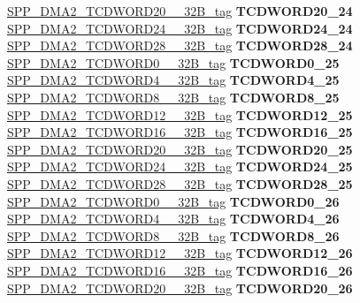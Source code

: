 \begin{DoxyCompactItemize}
\begin{tabbing}
\>\>\mbox{\hyperlink{unionSPP__DMA2__TCDWORD20____32B__tag}{SPP\_DMA2\_TCDWORD20\_\_32B\_tag}} {\bfseries TCDWORD20\_24}\\
\>\>\mbox{\hyperlink{unionSPP__DMA2__TCDWORD24____32B__tag}{SPP\_DMA2\_TCDWORD24\_\_32B\_tag}} {\bfseries TCDWORD24\_24}\\
\>\>\mbox{\hyperlink{unionSPP__DMA2__TCDWORD28____32B__tag}{SPP\_DMA2\_TCDWORD28\_\_32B\_tag}} {\bfseries TCDWORD28\_24}\\
\>\>\mbox{\hyperlink{unionSPP__DMA2__TCDWORD0____32B__tag}{SPP\_DMA2\_TCDWORD0\_\_32B\_tag}} {\bfseries TCDWORD0\_25}\\
\>\>\mbox{\hyperlink{unionSPP__DMA2__TCDWORD4____32B__tag}{SPP\_DMA2\_TCDWORD4\_\_32B\_tag}} {\bfseries TCDWORD4\_25}\\
\>\>\mbox{\hyperlink{unionSPP__DMA2__TCDWORD8____32B__tag}{SPP\_DMA2\_TCDWORD8\_\_32B\_tag}} {\bfseries TCDWORD8\_25}\\
\>\>\mbox{\hyperlink{unionSPP__DMA2__TCDWORD12____32B__tag}{SPP\_DMA2\_TCDWORD12\_\_32B\_tag}} {\bfseries TCDWORD12\_25}\\
\>\>\mbox{\hyperlink{unionSPP__DMA2__TCDWORD16____32B__tag}{SPP\_DMA2\_TCDWORD16\_\_32B\_tag}} {\bfseries TCDWORD16\_25}\\
\>\>\mbox{\hyperlink{unionSPP__DMA2__TCDWORD20____32B__tag}{SPP\_DMA2\_TCDWORD20\_\_32B\_tag}} {\bfseries TCDWORD20\_25}\\
\>\>\mbox{\hyperlink{unionSPP__DMA2__TCDWORD24____32B__tag}{SPP\_DMA2\_TCDWORD24\_\_32B\_tag}} {\bfseries TCDWORD24\_25}\\
\>\>\mbox{\hyperlink{unionSPP__DMA2__TCDWORD28____32B__tag}{SPP\_DMA2\_TCDWORD28\_\_32B\_tag}} {\bfseries TCDWORD28\_25}\\
\>\>\mbox{\hyperlink{unionSPP__DMA2__TCDWORD0____32B__tag}{SPP\_DMA2\_TCDWORD0\_\_32B\_tag}} {\bfseries TCDWORD0\_26}\\
\>\>\mbox{\hyperlink{unionSPP__DMA2__TCDWORD4____32B__tag}{SPP\_DMA2\_TCDWORD4\_\_32B\_tag}} {\bfseries TCDWORD4\_26}\\
\>\>\mbox{\hyperlink{unionSPP__DMA2__TCDWORD8____32B__tag}{SPP\_DMA2\_TCDWORD8\_\_32B\_tag}} {\bfseries TCDWORD8\_26}\\
\>\>\mbox{\hyperlink{unionSPP__DMA2__TCDWORD12____32B__tag}{SPP\_DMA2\_TCDWORD12\_\_32B\_tag}} {\bfseries TCDWORD12\_26}\\
\>\>\mbox{\hyperlink{unionSPP__DMA2__TCDWORD16____32B__tag}{SPP\_DMA2\_TCDWORD16\_\_32B\_tag}} {\bfseries TCDWORD16\_26}\\
\>\>\mbox{\hyperlink{unionSPP__DMA2__TCDWORD20____32B__tag}{SPP\_DMA2\_TCDWORD20\_\_32B\_tag}} {\bfseries TCDWORD20\_26}\\

\end{tabbing}
\end{DoxyCompactItemize}

